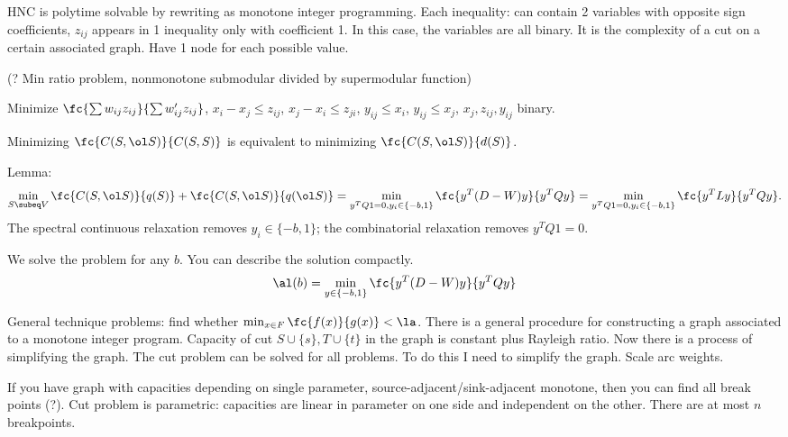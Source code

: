 HNC is polytime solvable by rewriting as monotone integer programming. Each inequality: can contain 2 variables with opposite sign coefficients, $z_{ij}$ appears in 1 inequality only with coefficient 1. 
In this case, the variables are all binary. It is the complexity of a cut on a certain associated graph.  Have 1 node for each possible value. 

(? Min ratio problem, nonmonotone submodular divided by supermodular function)

Minimize $\fc{\sum w_{ij}z_{ij}}{\sum w_{ij}' z_{ij}}$, $x_i - x_j\le z_{ij}$, $x_j-x_i\le z_{ji}$, $y_{ij}\le x_i$, $y_{ij}\le x_j$, $x_j,z_{ij},y_{ij}$ binary.

Minimizing $\fc{C(S,\ol S)}{C(S,S)}$ is equivalent to minimizing $\fc{C(S,\ol S)}{d(S)}$.

Lemma:
$$
\min_{S\subeq V} \fc{C(S, \ol S)}{q(S)} + \fc{C(S,\ol S)}{q(\ol S)} = \min_{y^TQ1=0, y_i\in \{-b,1\}} \fc{y^T (D-W)y}{y^TQy} = \min_{y^TQ1=0, y_i\in \{-b,1\}} \fc{y^T Ly}{y^TQy}.
$$
The spectral continuous relaxation removes $y_i\in \{-b,1\}$; the combinatorial relaxation removes $y^TQ1=0$.

We solve the problem for any $b$.  You can describe the solution compactly. %
$$
\al(b) = \min_{y\in \{-b,1\}} \fc{y^T(D-W)y}{y^TQy} 
$$

General technique problems: find whether $\min_{x\in F}\fc{f(x)}{g(x)}<\la$. 
There is a general procedure for constructing a graph associated to a monotone integer program. 
Capacity of cut $S\cup \{s\}, T\cup \{t\}$ in the graph is constant plus Rayleigh ratio. Now there is a process of simplifying the graph. The cut problem can be solved for all problems. To do this I need to simplify the graph. 
Scale arc weights.

If you have graph with capacities depending on single  parameter, source-adjacent/sink-adjacent monotone, then you can find all break points (?). Cut problem is parametric: capacities are linear in parameter on one side and independent on the other. There are at most $n$ breakpoints.

